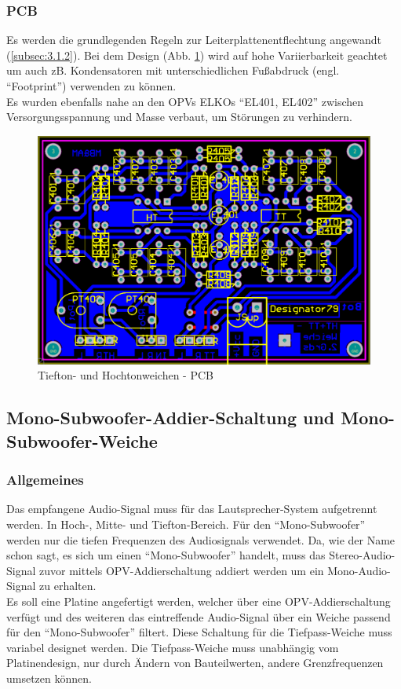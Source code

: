 \newpage
\subsubsection{PCB}\label{subsec:4.3.3}
Es werden die grundlegenden Regeln zur Leiterplattenentflechtung angewandt (\ref{subsec:3.1.2}).
Bei dem Design (Abb. \ref{fig:4.3.3.1}) wird auf hohe Variierbarkeit geachtet um auch zB. Kondensatoren mit unterschiedlichen Fußabdruck (engl. \enquote{Footprint}) verwenden zu können.\\
Es wurden ebenfalls nahe an den OPVs ELKOs \enquote{EL401, EL402} zwischen Versorgungsspannung und Masse verbaut, um Störungen zu verhindern.
\begin{figure} [H]
	\centering	
	\includegraphics[width=1\textwidth]{img/Print4/4_TTuHTWeiche-PCB.PNG}
	\caption{Tiefton- und Hochtonweichen - PCB}
	\label {fig:4.3.3.1}
\end{figure}


\newpage
\subsection*{Mono-Subwoofer-Addier-Schaltung und Mono-Subwoofer-Weiche}\label{sec:4.2}
\subsubsection{Allgemeines}\label{susec:4.2.1}
Das empfangene Audio-Signal muss für das Lautsprecher-System aufgetrennt werden. In Hoch-, Mitte- und Tiefton-Bereich.
Für den \enquote{Mono-Subwoofer} werden nur die tiefen Frequenzen des Audiosignals verwendet.
Da, wie der Name schon sagt, es sich um einen \enquote{Mono-Subwoofer} handelt, muss das Stereo-Audio-Signal zuvor mittels OPV-Addierschaltung addiert werden um ein Mono-Audio-Signal zu erhalten.\\
Es soll eine Platine angefertigt werden, welcher über eine OPV-Addierschaltung verfügt und des weiteren das eintreffende Audio-Signal über ein Weiche passend für den \enquote{Mono-Subwoofer} filtert.
Diese Schaltung für die Tiefpass-Weiche muss variabel designet werden. Die Tiefpass-Weiche muss unabhängig vom Platinendesign, nur durch Ändern von Bauteilwerten, andere Grenzfrequenzen umsetzen können.

